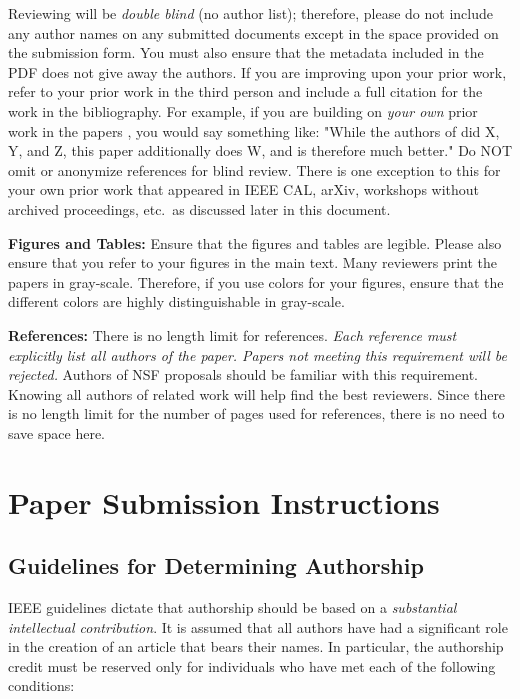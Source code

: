 \documentclass{sig-alternate}
\begin{document}
Reviewing will be {\em double blind} (no author list); therefore, please do not include any author names on any submitted documents except in the space provided on the submission form.  You must also ensure that the metadata included in the PDF does not give away the authors. If you are improving upon your prior work, refer to your prior work in the third person and include a full citation for the work in the bibliography.  For example, if you are building on {\em your own} prior work in the papers \cite{nicepaper1,nicepaper2,nicepaper3}, you would say something like: "While the authors of \cite{nicepaper1,nicepaper2,nicepaper3} did X, Y, and Z, this paper additionally does W, and is therefore much better."  Do NOT omit or anonymize references for blind review.  There is one exception to this for your own prior work that appeared in IEEE CAL, arXiv, workshops without archived proceedings, etc.\, as discussed later in this document.

\noindent\textbf{Figures and Tables:} Ensure that the figures and tables are legible.  Please also ensure that you refer to your figures in the main text.  Many reviewers print the papers in gray-scale. Therefore, if you use colors for your figures, ensure that the different colors are highly distinguishable in gray-scale.

\noindent\textbf{References:}  There is no length limit for references. {\em Each reference must explicitly list all authors of the paper.  Papers not meeting this requirement will be rejected.} Authors of NSF proposals should be familiar with this requirement. Knowing all authors of related work will help find the best reviewers. Since there is no length limit for the number of pages used for references, there is no need to save space here.

\section{Paper Submission Instructions}

\subsection{Guidelines for Determining Authorship}
IEEE guidelines dictate that authorship should be based on a {\em substantial intellectual contribution}. It is assumed that all authors have had a significant role in the creation of an article that bears their names. In particular, the authorship credit must be reserved only for individuals who have met each of the following conditions:
\end{document}
